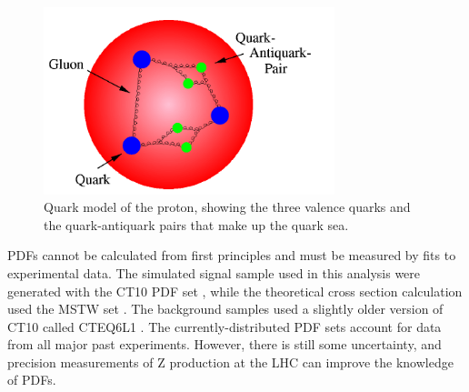 
 \begin{figure}[htb]
  \begin{center}
    \includegraphics[width=240pt]{Figures/theory-quark-proton-naif-desy.png}
  \end{center}
  \caption[\fixspacing Quark model of proton]
	  {\fixspacing Quark model of the proton, 
	    showing the three valence quarks 
	    and the quark-antiquark pairs 
	    that make up the quark sea. 
	  }
  \label{fig:ProtonQuarkModel}
 \end{figure}



PDFs cannot be calculated from first 
principles and must be measured by fits 
to experimental data.  
The simulated signal sample used in this analysis 
were generated with the CT10 PDF set \cite{CT10}, 
while the theoretical cross section calculation 
used the MSTW set \cite{MSTW}.  
The background samples used a slightly older 
version of CT10 called CTEQ6L1 \cite{CTEQ6L1}. 
The currently-distributed PDF sets 
account for data from all major past experiments.  
However, there is still some uncertainty, 
and precision measurements of Z production 
at the LHC can %
improve the 
knowledge of PDFs.  




